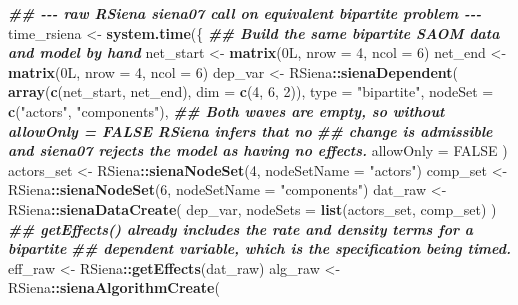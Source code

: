 \documentclass[
]{article}
\newenvironment{Shaded}{\begin{snugshade}}{\end{snugshade}}
\newcommand{\AttributeTok}[1]{\textcolor[rgb]{0.13,0.29,0.53}{#1}}
\newcommand{\ConstantTok}[1]{\textcolor[rgb]{0.56,0.35,0.01}{#1}}
\newcommand{\DataTypeTok}[1]{\textcolor[rgb]{0.13,0.29,0.53}{#1}}
\newcommand{\DecValTok}[1]{\textcolor[rgb]{0.00,0.00,0.81}{#1}}
\newcommand{\DocumentationTok}[1]{\textcolor[rgb]{0.56,0.35,0.01}{\textbf{\textit{#1}}}}
\newcommand{\FunctionTok}[1]{\textcolor[rgb]{0.13,0.29,0.53}{\textbf{#1}}}
\newcommand{\NormalTok}[1]{#1}
\newcommand{\OtherTok}[1]{\textcolor[rgb]{0.56,0.35,0.01}{#1}}
\newcommand{\SpecialCharTok}[1]{\textcolor[rgb]{0.81,0.36,0.00}{\textbf{#1}}}
\newcommand{\StringTok}[1]{\textcolor[rgb]{0.31,0.60,0.02}{#1}}
\begin{document}
\begin{Shaded}
\begin{Highlighting}[]
\DocumentationTok{\#\# {-}{-}{-} raw RSiena siena07 call on equivalent bipartite problem {-}{-}{-}}
\NormalTok{time\_rsiena }\OtherTok{\textless{}{-}} \FunctionTok{system.time}\NormalTok{(\{}
  \DocumentationTok{\#\# Build the same bipartite SAOM data and model by hand}
\NormalTok{  net\_start }\OtherTok{\textless{}{-}} \FunctionTok{matrix}\NormalTok{(}\DecValTok{0}\DataTypeTok{L}\NormalTok{, }\AttributeTok{nrow =} \DecValTok{4}\NormalTok{, }\AttributeTok{ncol =} \DecValTok{6}\NormalTok{)}
\NormalTok{  net\_end   }\OtherTok{\textless{}{-}} \FunctionTok{matrix}\NormalTok{(}\DecValTok{0}\DataTypeTok{L}\NormalTok{, }\AttributeTok{nrow =} \DecValTok{4}\NormalTok{, }\AttributeTok{ncol =} \DecValTok{6}\NormalTok{)}
\NormalTok{  dep\_var   }\OtherTok{\textless{}{-}}\NormalTok{ RSiena}\SpecialCharTok{::}\FunctionTok{sienaDependent}\NormalTok{(}
    \FunctionTok{array}\NormalTok{(}\FunctionTok{c}\NormalTok{(net\_start, net\_end), }\AttributeTok{dim =} \FunctionTok{c}\NormalTok{(}\DecValTok{4}\NormalTok{, }\DecValTok{6}\NormalTok{, }\DecValTok{2}\NormalTok{)),}
    \AttributeTok{type =} \StringTok{"bipartite"}\NormalTok{, }\AttributeTok{nodeSet =} \FunctionTok{c}\NormalTok{(}\StringTok{"actors"}\NormalTok{, }\StringTok{"components"}\NormalTok{),}
    \DocumentationTok{\#\# Both waves are empty, so without allowOnly = FALSE RSiena infers that no}
    \DocumentationTok{\#\# change is admissible and siena07 rejects the model as having no effects.}
    \AttributeTok{allowOnly =} \ConstantTok{FALSE}
\NormalTok{  )}
\NormalTok{  actors\_set }\OtherTok{\textless{}{-}}\NormalTok{ RSiena}\SpecialCharTok{::}\FunctionTok{sienaNodeSet}\NormalTok{(}\DecValTok{4}\NormalTok{, }\AttributeTok{nodeSetName =} \StringTok{"actors"}\NormalTok{)}
\NormalTok{  comp\_set   }\OtherTok{\textless{}{-}}\NormalTok{ RSiena}\SpecialCharTok{::}\FunctionTok{sienaNodeSet}\NormalTok{(}\DecValTok{6}\NormalTok{, }\AttributeTok{nodeSetName =} \StringTok{"components"}\NormalTok{)}
\NormalTok{  dat\_raw    }\OtherTok{\textless{}{-}}\NormalTok{ RSiena}\SpecialCharTok{::}\FunctionTok{sienaDataCreate}\NormalTok{(}
\NormalTok{    dep\_var,}
    \AttributeTok{nodeSets =} \FunctionTok{list}\NormalTok{(actors\_set, comp\_set)}
\NormalTok{  )}
  \DocumentationTok{\#\# getEffects() already includes the rate and density terms for a bipartite}
  \DocumentationTok{\#\# dependent variable, which is the specification being timed.}
\NormalTok{  eff\_raw }\OtherTok{\textless{}{-}}\NormalTok{ RSiena}\SpecialCharTok{::}\FunctionTok{getEffects}\NormalTok{(dat\_raw)}
\NormalTok{  alg\_raw }\OtherTok{\textless{}{-}}\NormalTok{ RSiena}\SpecialCharTok{::}\FunctionTok{sienaAlgorithmCreate}\NormalTok{(}

\end{Highlighting}
\end{Shaded}
\end{document}

